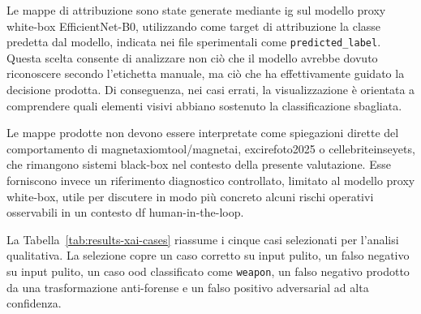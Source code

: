 Le mappe di attribuzione sono state generate mediante \gls{ig} sul modello proxy
white-box EfficientNet-B0, utilizzando come target di attribuzione la classe
predetta dal modello, indicata nei file sperimentali come
\texttt{predicted\_label}. Questa scelta consente di analizzare non ciò che il
modello avrebbe dovuto riconoscere secondo l'etichetta manuale, ma ciò che ha
effettivamente guidato la decisione prodotta. Di conseguenza, nei casi errati,
la visualizzazione è orientata a comprendere quali elementi visivi abbiano
sostenuto la classificazione sbagliata.

Le mappe prodotte non devono essere interpretate come spiegazioni dirette del
comportamento di \gls{magnetaxiomtool}/\gls{magnetai},
\gls{excirefoto2025} o \gls{cellebriteinseyets}, che rimangono sistemi
black-box nel contesto della presente valutazione. Esse forniscono invece un
riferimento diagnostico controllato, limitato al modello proxy white-box, utile
per discutere in modo più concreto alcuni rischi operativi osservabili in un
contesto \gls{df} human-in-the-loop.

La Tabella~\ref{tab:results-xai-cases} riassume i cinque casi selezionati per
l'analisi qualitativa. La selezione copre un caso corretto su input pulito, un
falso negativo su input pulito, un caso \gls{ood} classificato come
\texttt{weapon}, un falso negativo prodotto da una trasformazione anti-forense e
un falso positivo adversarial ad alta confidenza.

